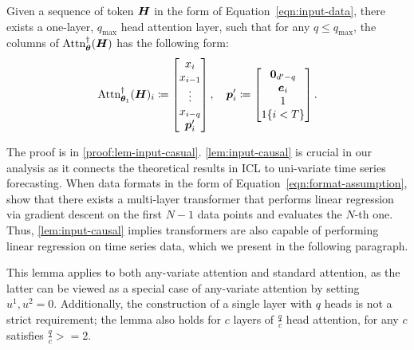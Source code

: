 \begin{lemma}\label{lem:input-causal}
    Given a sequence of token $\boldsymbol{H}$ in the form of Equation~\ref{eqn:input-data}, there exists a one-layer, $q_{\max}$ head attention layer, such that for any $q \leq q_{\max}$, the columns of $\text{Attn}_{\bm{\theta}}^{\dagger}( \boldsymbol{H} )$ has the following form:
    \begin{equation}
    \text{Attn}_{\bm{\theta}_1}^{\dagger}( \boldsymbol{H} )_i
    \coloneqq
        \begin{bmatrix}
            x_i
            \\
            x_{i-1}
            \\
            \vdots
            \\
            x_{i-q}
            \\
            \bm{p}_i^\prime
        \end{bmatrix},
        \quad
        \bm{p}_i^\prime 
        \coloneqq
        \begin{bmatrix}
        \mathbf{0}_{ d^\prime - q }
        \\
        \bm{e}_i
        \\
        1
        \\
        1 \{ i < T \}
        \end{bmatrix}.
    \end{equation}
\end{lemma}
The proof is in \cref{proof:lem-input-casual}.
\cref{lem:input-causal} is crucial in our analysis as it connects the theoretical results in ICL \cite{bai2024transformers} to uni-variate time series forecasting.
When data formats in the form of Equation~\eqref{eqn:format-assumption}, \cite{bai2024transformers} show that there exists a multi-layer transformer that performs linear regression via gradient descent on the first $N-1$ data points and evaluates the $N$-th one.
Thus, \cref{lem:input-causal} implies transformers are also capable of performing linear regression on time series data, which we present in the following paragraph.

This lemma applies to both any-variate attention and standard attention, as the latter can be viewed as a special case of any-variate attention by setting $u^1, u^2 = 0$.
Additionally, the construction of a single layer with $q$ heads is not a strict requirement; the lemma also holds for $c$ layers of  $\frac{q}{c}$ head attention, for any $c$ satisfies $\frac{q}{c} >= 2$.

